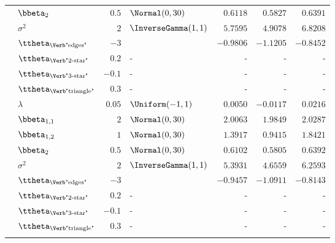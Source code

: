 \begin{table}[t]
\begin{tabular}{cl|rlrrr}
        & $\bbeta_{2}$                       & $0.5$  & $\Normal(0,30)$        & $0.6118$  & $0.5827$  & $0.6391$  \\
        & $\sigma^2$                         & $2$    & $\InverseGamma(1,1)$   & $5.7595$  & $4.9078$  & $6.8208$  \\
        & $\ttheta_{\text{\Verb"edges"}}$    & $-3$   &  & $-0.9806$ & $-1.1205$ & $-0.8452$ \\
        & $\ttheta_{\text{\Verb"2-star"}}$   & $0.2$  & -                      & -         & -         & -         \\
        & $\ttheta_{\text{\Verb"3-star"}}$   & $-0.1$ & -                      & -         & -         & -         \\
        & $\ttheta_{\text{\Verb"triangle"}}$ & $0.3$  & -                      & -         & -         & -         \\
		\midrule
        & $\lambda$                          & $0.05$ & $\Uniform(-1,1)$       & $0.0050$  & $-0.0117$ & $0.0216$  \\
        & $\bbeta_{1,1}$                     & $2$    & $\Normal(0,30)$        & $2.0063$  & $1.9849$  & $2.0287$  \\
        & $\bbeta_{1,2}$                     & $1$    & $\Normal(0,30)$        & $1.3917$  & $0.9415$  & $1.8421$  \\
        & $\bbeta_{2}$                       & $0.5$  & $\Normal(0,30)$        & $0.6102$  & $0.5805$  & $0.6392$  \\
        & $\sigma^2$                         & $2$    & $\InverseGamma(1,1)$   & $5.3931$  & $4.6559$  & $6.2593$  \\
        & $\ttheta_{\text{\Verb"edges"}}$    & $-3$   &  & $-0.9457$ & $-1.0911$ & $-0.8143$ \\
        & $\ttheta_{\text{\Verb"2-star"}}$   & $0.2$  & -                      & -         & -         & -         \\
        & $\ttheta_{\text{\Verb"3-star"}}$   & $-0.1$ & -                      & -         & -         & -         \\
        & $\ttheta_{\text{\Verb"triangle"}}$ & $0.3$  & -                      & -         & -         & -         \\
		\midrule

\end{tabular}
\end{table}
